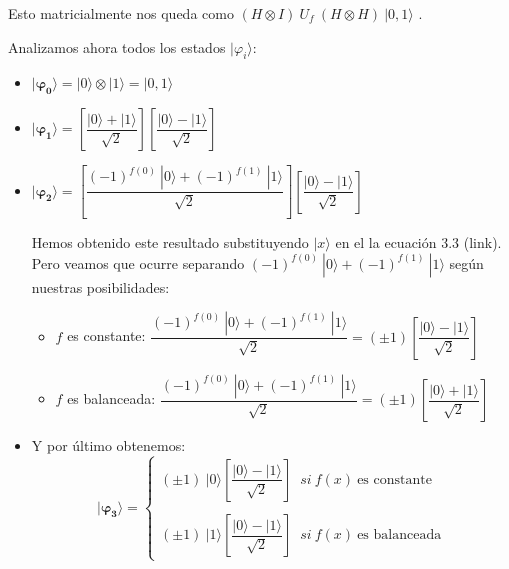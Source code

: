 \vspace{30pt}

Esto matricialmente nos queda como $(H\otimes I)\:U_{f}\:(H\otimes H)\:|0,1\rangle$ .\newline

Analizamos ahora todos los estados $|\varphi_{i}\rangle$:

\begin{itemize}
    \item $\mathbf{|\varphi_{0}\rangle} = |0\rangle \otimes |1\rangle = |0,1\rangle$

    \vspace{5pt}

    \item  $\mathbf{|\varphi_{1}\rangle} = \left[ \dfrac{|0\rangle + |1\rangle}{\sqrt{2}}\right] \left[ \dfrac{|0\rangle - |1\rangle}{\sqrt{2}}\right]$

    \vspace{5pt}

    \item $\mathbf{|\varphi_{2}\rangle} = \left[ \dfrac{(-1)^{f(0)}\:|0\rangle + (-1)^{f(1)}\:|1\rangle}{\sqrt{2}}\right] \left[ \dfrac{|0\rangle - |1\rangle}{\sqrt{2}}\right]$\newline 
    
    Hemos obtenido este resultado substituyendo $|x\rangle$ en el la ecuación 3.3 (link). Pero veamos que ocurre separando $(-1)^{f(0)}\:|0\rangle + (-1)^{f(1)}\:|1\rangle$ según nuestras posibilidades:
    \begin{itemize}
        \item $f$ es constante: $\dfrac{(-1)^{f(0)}\:|0\rangle + (-1)^{f(1)}\:|1\rangle}{\sqrt{2}} = (\pm 1)\left[ \dfrac{|0\rangle - |1\rangle}{\sqrt{2}}\right]$

        \vspace{5pt}
        
        \item $f$ es balanceada: $\dfrac{(-1)^{f(0)}\:|0\rangle + (-1)^{f(1)}\:|1\rangle}{\sqrt{2}} = (\pm 1)\left[ \dfrac{|0\rangle + |1\rangle}{\sqrt{2}}\right]$

    \end{itemize}

    \vspace{5pt}
    
    \item Y por último obtenemos:
    \begin{equation}\mathbf{|\varphi_{3}\rangle} = \begin{cases} (\pm 1)\:|0\rangle \left[ \dfrac{|0\rangle - |1\rangle}{\sqrt{2}}\right] \;\; si \: f(x)\:\text{es constante} \\ \\ (\pm 1)\:|1\rangle \left[ \dfrac{|0\rangle - |1\rangle}{\sqrt{2}}\right] \;\; si \: f(x)\:\text{es balanceada} \end{cases}\end{equation}
\end{itemize}

